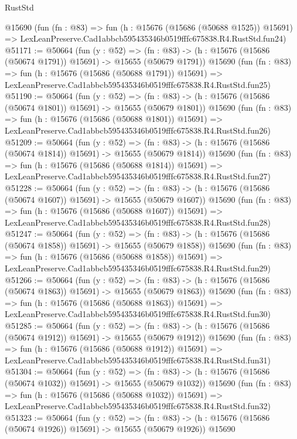 \begin{lexlean}{RustStd}
\begin{coremodule}
    @15690
    (fun (fn : @83) =>
    fun (h : @15676 (@15686 (@50688 @1525)) @15691) =>
    LexLeanPreserve.Cad1abbcb595435346b0519fffc675838.R4.RustStd.fun24)
@51171 := @50664
    (fun (y : @52) =>
    (fn : @83) -> (h : @15676 (@15686 (@50674 @1791)) @15691) -> @15655 (@50679 @1791))
    @15690
    (fun (fn : @83) =>
    fun (h : @15676 (@15686 (@50688 @1791)) @15691) =>
    LexLeanPreserve.Cad1abbcb595435346b0519fffc675838.R4.RustStd.fun25)
@51190 := @50664
    (fun (y : @52) =>
    (fn : @83) -> (h : @15676 (@15686 (@50674 @1801)) @15691) -> @15655 (@50679 @1801))
    @15690
    (fun (fn : @83) =>
    fun (h : @15676 (@15686 (@50688 @1801)) @15691) =>
    LexLeanPreserve.Cad1abbcb595435346b0519fffc675838.R4.RustStd.fun26)
@51209 := @50664
    (fun (y : @52) =>
    (fn : @83) -> (h : @15676 (@15686 (@50674 @1814)) @15691) -> @15655 (@50679 @1814))
    @15690
    (fun (fn : @83) =>
    fun (h : @15676 (@15686 (@50688 @1814)) @15691) =>
    LexLeanPreserve.Cad1abbcb595435346b0519fffc675838.R4.RustStd.fun27)
@51228 := @50664
    (fun (y : @52) =>
    (fn : @83) -> (h : @15676 (@15686 (@50674 @1607)) @15691) -> @15655 (@50679 @1607))
    @15690
    (fun (fn : @83) =>
    fun (h : @15676 (@15686 (@50688 @1607)) @15691) =>
    LexLeanPreserve.Cad1abbcb595435346b0519fffc675838.R4.RustStd.fun28)
@51247 := @50664
    (fun (y : @52) =>
    (fn : @83) -> (h : @15676 (@15686 (@50674 @1858)) @15691) -> @15655 (@50679 @1858))
    @15690
    (fun (fn : @83) =>
    fun (h : @15676 (@15686 (@50688 @1858)) @15691) =>
    LexLeanPreserve.Cad1abbcb595435346b0519fffc675838.R4.RustStd.fun29)
@51266 := @50664
    (fun (y : @52) =>
    (fn : @83) -> (h : @15676 (@15686 (@50674 @1863)) @15691) -> @15655 (@50679 @1863))
    @15690
    (fun (fn : @83) =>
    fun (h : @15676 (@15686 (@50688 @1863)) @15691) =>
    LexLeanPreserve.Cad1abbcb595435346b0519fffc675838.R4.RustStd.fun30)
@51285 := @50664
    (fun (y : @52) =>
    (fn : @83) -> (h : @15676 (@15686 (@50674 @1912)) @15691) -> @15655 (@50679 @1912))
    @15690
    (fun (fn : @83) =>
    fun (h : @15676 (@15686 (@50688 @1912)) @15691) =>
    LexLeanPreserve.Cad1abbcb595435346b0519fffc675838.R4.RustStd.fun31)
@51304 := @50664
    (fun (y : @52) =>
    (fn : @83) -> (h : @15676 (@15686 (@50674 @1032)) @15691) -> @15655 (@50679 @1032))
    @15690
    (fun (fn : @83) =>
    fun (h : @15676 (@15686 (@50688 @1032)) @15691) =>
    LexLeanPreserve.Cad1abbcb595435346b0519fffc675838.R4.RustStd.fun32)
@51323 := @50664
    (fun (y : @52) =>
    (fn : @83) -> (h : @15676 (@15686 (@50674 @1926)) @15691) -> @15655 (@50679 @1926))
    @15690

\end{coremodule}
\end{lexlean}

